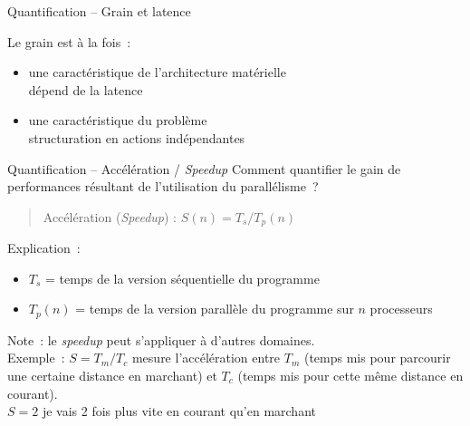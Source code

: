 \begin {frame} {Quantification -- Grain et latence}

    Le grain est à la fois~:

    \begin {itemize}
	\item une caractéristique de l'architecture matérielle
	    \\
	    \implique dépend de la latence

	\item une caractéristique du problème
	    \\
	    \implique structuration en actions indépendantes

    \end {itemize}

\end {frame}

\begin {frame} {Quantification -- Accélération / \emph {Speedup}}
    Comment quantifier le gain de performances résultant de l'utilisation
    du parallélisme~?

    \vspace* {3mm}

    \begin {quote}
	Accélération (\emph {Speedup\/}) : $S(n)=T_s / T_p(n)$
    \end {quote}

    Explication~:
    \begin {itemize}
	\item $T_s$ = temps de la version séquentielle du programme
	\item $T_p (n)$ = temps de la version parallèle du programme
	    sur $n$ processeurs

    \end {itemize}

    \vspace* {3mm}
    \small
    Note~: le \emph {speedup} peut s'appliquer à d'autres
    domaines.
    \\
    Exemple~: $S=T_m / T_c$ mesure l'accélération entre $T_m$ (temps
    mis pour parcourir une certaine distance en marchant) et $T_c$ (temps
    mis pour cette même distance en courant).
    \\
    $S = 2$ \implique je vais 2 fois plus vite en courant qu'en marchant

\end {frame}

